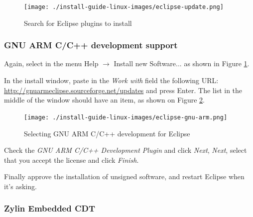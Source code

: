 \documentclass[a4paper, 10pt]{article}
\begin{document}
    \begin{figure}[H]
    \centering
        \texttt{[image: ./install-guide-linux-images/eclipse-update.png]}
        \caption{Search for Eclipse plugins to install}
        \label{fig:eclipse-update}
    \end{figure}



%

\subsubsection{GNU ARM C/C++ development support}

Again, select in the menu Help $\rightarrow$ Install new Software... as shown in
Figure \ref{fig:eclipse-update}.

In the install window, paste in the \emph{Work with} field
the following URL:
\url{http://gnuarmeclipse.sourceforge.net/updates} and press Enter.
The list in the middle of the window should have an item, as shown on
Figure \ref{fig:eclipse-gnu-arm}.

    \begin{figure}[H]
    \centering
        \texttt{[image: ./install-guide-linux-images/eclipse-gnu-arm.png]}
        \caption{Selecting GNU ARM C/C++ development for Eclipse}
        \label{fig:eclipse-gnu-arm}
    \end{figure}

Check the \emph{GNU ARM C/C++ Development Plugin} and click \emph{Next},
\emph{Next}, select that you accept the license and click \emph{Finish}.

Finally approve the installation of unsigned software,
and restart Eclipse when it's asking.

\subsubsection{Zylin Embedded CDT}
\end{document}
